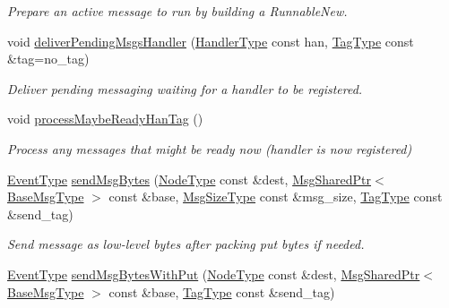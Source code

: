 \begin{DoxyCompactItemize}
\begin{DoxyCompactList}\small\item\em Prepare an active message to run by building a {\ttfamily Runnable\+New}. \end{DoxyCompactList}\item 
void \hyperlink{structvt_1_1messaging_1_1_active_messenger_a4013c1e40f1d295025fd6e0bad5e6c6d}{deliver\+Pending\+Msgs\+Handler} (\hyperlink{namespacevt_af64846b57dfcaf104da3ef6967917573}{Handler\+Type} const han, \hyperlink{namespacevt_a84ab281dae04a52a4b243d6bf62d0e52}{Tag\+Type} const \&tag=no\+\_\+tag)
\begin{DoxyCompactList}\small\item\em Deliver pending messaging waiting for a handler to be registered. \end{DoxyCompactList}\item 
void \hyperlink{structvt_1_1messaging_1_1_active_messenger_ac9fcc6ef325258985074c699b0d783c6}{process\+Maybe\+Ready\+Han\+Tag} ()
\begin{DoxyCompactList}\small\item\em Process any messages that might be ready now (handler is now registered) \end{DoxyCompactList}\item 
\hyperlink{namespacevt_a009267401def7ae8bf201892222d060f}{Event\+Type} \hyperlink{structvt_1_1messaging_1_1_active_messenger_ab3542048b6c0f380899643b031eb1731}{send\+Msg\+Bytes} (\hyperlink{namespacevt_a866da9d0efc19c0a1ce79e9e492f47e2}{Node\+Type} const \&dest, \hyperlink{structvt_1_1messaging_1_1_msg_shared_ptr}{Msg\+Shared\+Ptr}$<$ \hyperlink{namespacevt_a44d0d4e144748f2b19a1cfd962f50338}{Base\+Msg\+Type} $>$ const \&base, \hyperlink{namespacevt_a408e86a8c7c89309b52907dc5a513924}{Msg\+Size\+Type} const \&msg\+\_\+size, \hyperlink{namespacevt_a84ab281dae04a52a4b243d6bf62d0e52}{Tag\+Type} const \&send\+\_\+tag)
\begin{DoxyCompactList}\small\item\em Send message as low-\/level bytes after packing put bytes if needed. \end{DoxyCompactList}\item 
\hyperlink{namespacevt_a009267401def7ae8bf201892222d060f}{Event\+Type} \hyperlink{structvt_1_1messaging_1_1_active_messenger_a70f99446c7d25227d3fe1b759a7f84a4}{send\+Msg\+Bytes\+With\+Put} (\hyperlink{namespacevt_a866da9d0efc19c0a1ce79e9e492f47e2}{Node\+Type} const \&dest, \hyperlink{structvt_1_1messaging_1_1_msg_shared_ptr}{Msg\+Shared\+Ptr}$<$ \hyperlink{namespacevt_a44d0d4e144748f2b19a1cfd962f50338}{Base\+Msg\+Type} $>$ const \&base, \hyperlink{namespacevt_a84ab281dae04a52a4b243d6bf62d0e52}{Tag\+Type} const \&send\+\_\+tag)

\end{DoxyCompactItemize}
